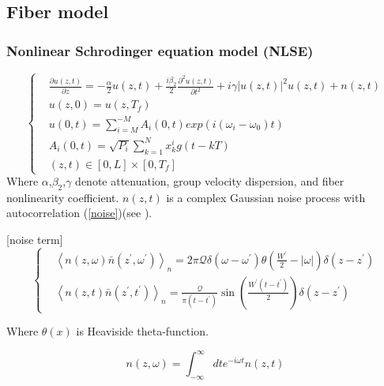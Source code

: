 \subsection{Fiber model}
\subsubsection{Nonlinear Schrodinger equation model (NLSE)}
\begin{equation}\label{model}
\left\{
\begin{aligned}
& \frac{\partial u(z, t)}{\partial z}=-\frac{\alpha}{2}u(z,t) + \frac{i\beta_2}{2} \frac{\partial^2 u(z,t)}{\partial t^2} + i \gamma \left|u(z, t)\right|^{2} u(z, t) + n(z,t) \\
& u(z,0) = u(z,T_f) \\
& u(0,t) = \sum_{i=M}^{-M} A_i(0,t) exp(i (\omega_i - \omega_0) t) \\
& A_i(0,t) = \sqrt{P_i}\sum_{k=1}^{N} x^i_k g(t - kT) \\
& (z,t) \in [0,L] \times [0,T_f]
\end{aligned}
\right.
\end{equation}
Where $\alpha$,$\beta_2$,$\gamma$ denote attenuation, group velocity dispersion, and fiber nonlinearity coefficient.  $n(z,t)$ is a complex Gaussian noise process with autocorrelation (\ref{noise})(see \cite{path_int}). 
\begin{remark}\label{noise}
[noise term]
\begin{equation}
\left\{
\begin{aligned}
& \left\langle n(z, \omega) \bar{n}\left(z^{\prime}, \omega^{\prime}\right)\right\rangle_{n}=2 \pi \mathcal{Q} \delta\left(\omega-\omega^{\prime}\right) \theta\left(\frac{W^{\prime}}{2}-|\omega|\right) \delta\left(z-z^{\prime}\right) \\
& \left\langle n(z, t) \bar{n}\left(z^{\prime}, t^{\prime}\right)\right\rangle_{n}=\frac{\mathcal{Q}}{\pi\left(t-t^{\prime}\right)} \sin \left(\frac{W^{\prime}\left(t-t^{\prime}\right)}{2}\right) \delta\left(z-z^{\prime}\right)
\end{aligned}
\right.
\end{equation}

Where $\theta(x)$ is Heaviside theta-function. 

\end{remark}


\begin{remark}
[FT]
$$
n(z, \omega)=\int_{-\infty}^{\infty} d t e^{-i \omega t} n(z, t)
$$
\end{remark}



